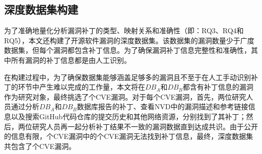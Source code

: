 \subsection{深度数据集构建}
为了准确地量化分析漏洞补丁的类型、映射关系和准确性（即：RQ3、RQ4和RQ5），本文还构建了开源软件漏洞的深度数据集。该数据集的漏洞数量少于广度数据集，但每个漏洞都包含补丁信息。为了确保漏洞补丁信息完整性和准确性，其中所有漏洞的补丁信息都是由人工识别。

在构建过程中，为了确保数据集能够涵盖足够多的漏洞且不至于在人工手动识别补丁的环节中产生难以完成的工作量，本文将在$DB_A$和$DB_B$都含有补丁信息的漏洞作为研究对象，最终挑选了个CVE漏洞。对于每个CVE漏洞，首先，两位研究人员通过分析$DB_A$和$DB_B$数据库报告的补丁、查看NVD中的漏洞描述和参考链接信息以及搜索GitHub代码仓库的提交历史和其他网络资源，分别找到了其补丁；然后，两位研究人员再一起分析补丁结果不一致的漏洞数据直到达成共识。由于公开的信息有限，个CVE漏洞中的个CVE漏洞无法找到补丁信息，最终，深度数据集共包含了个CVE漏洞。 


